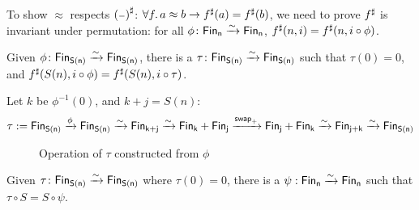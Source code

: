 To show $\approx$ respects ${({\scriptstyle{-}})}^{\sharp}$: $\forall f. \, a \approx b \to {f}^{\sharp}(a) = {f}^{\sharp}(b)$,
we need to prove ${f}^{\sharp}$ is invariant under permutation: for all $\phi\colon \Fin[n]\xto{\sim}\Fin[n]$,
$\ext{f}(n, i) \id \ext{f}(n, i \circ \phi)$.

\begin{lemma}
Given $\phi\colon \Fin[S(n)]\xto{\sim}\Fin[S(n)]$, there is a $\tau\colon \Fin[S(n)]\xto{\sim}\Fin[S(n)]$
such that $\tau(0) = 0$, and ${f}^{\sharp}(S(n), i \circ \phi) = {f}^{\sharp}(S(n), i \circ \tau)$.
\end{lemma}

Let $k$ be $\phi^{-1}(0)$, and $k + j = S(n)$:
\begin{align*}
    \tau := \Fin[S(n)] \xto{\phi} \Fin[S(n)] \xto{\sim} \Fin[k+j] \xto{\sim} \Fin[k] + \Fin[j]
    \xto{\term{swap}_{+}} \Fin[j] + \Fin[k] \xto{\sim} \Fin[j+k] \xto{\sim} \Fin[S(n)]
\end{align*}

\begin{figure}[H]
    \centering
    \hspace{1em}
    \caption{Operation of $\tau$ constructed from $\phi$}
    \label{fig:enter-label}
\end{figure}

\begin{lemma}
Given $\tau\colon \Fin[S(n)]\xto{\sim}\Fin[S(n)]$ where $\tau(0) = 0$,
there is a $\psi : \Fin[n] \xto{\sim} \Fin[n]$ such that $\tau \circ S = S \circ \psi$.
\end{lemma}

